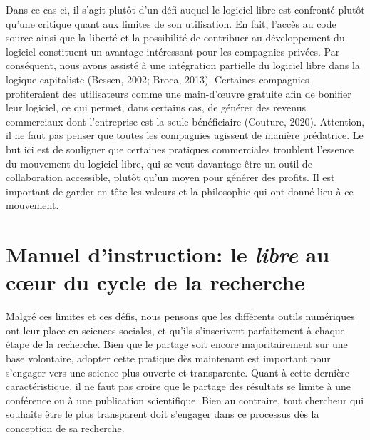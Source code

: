 \documentclass[
  letterpaper,
  DIV=11,
  numbers=noendperiod,
  oneside]{scrreprt}
\begin{document}
Dans ce cas-ci, il s'agit plutôt d'un défi auquel le logiciel libre est
confronté plutôt qu'une critique quant aux limites de son utilisation.
En fait, l'accès au code source ainsi que la liberté et la possibilité
de contribuer au développement du logiciel constituent un avantage
intéressant pour les compagnies privées. Par conséquent, nous avons
assisté à une intégration partielle du logiciel libre dans la logique
capitaliste (Bessen, 2002; Broca, 2013). Certaines compagnies
profiteraient des utilisateurs comme une main-d'œuvre gratuite afin de
bonifier leur logiciel, ce qui permet, dans certains cas, de générer des
revenus commerciaux dont l'entreprise est la seule bénéficiaire
(Couture, 2020). Attention, il ne faut pas penser que toutes les
compagnies agissent de manière prédatrice. Le but ici est de souligner
que certaines pratiques commerciales troublent l'essence du mouvement du
logiciel libre, qui se veut davantage être un outil de collaboration
accessible, plutôt qu'un moyen pour générer des profits. Il est
important de garder en tête les valeurs et la philosophie qui ont donné
lieu à ce mouvement.

\hypertarget{manuel-dinstruction-le-libre-au-cux153ur-du-cycle-de-la-recherche}{%
\section{\texorpdfstring{Manuel d'instruction: le \emph{libre} au cœur
du cycle de la
recherche}{Manuel d'instruction: le libre au cœur du cycle de la recherche}}\label{manuel-dinstruction-le-libre-au-cux153ur-du-cycle-de-la-recherche}}

Malgré ces limites et ces défis, nous pensons que les différents outils
numériques ont leur place en sciences sociales, et qu'ils s'inscrivent
parfaitement à chaque étape de la recherche. Bien que le partage soit
encore majoritairement sur une base volontaire, adopter cette pratique
dès maintenant est important pour s'engager vers une science plus
ouverte et transparente. Quant à cette dernière caractéristique, il ne
faut pas croire que le partage des résultats se limite à une conférence
ou à une publication scientifique. Bien au contraire, tout chercheur qui
souhaite être le plus transparent doit s'engager dans ce processus dès
la conception de sa recherche.
\end{document}
